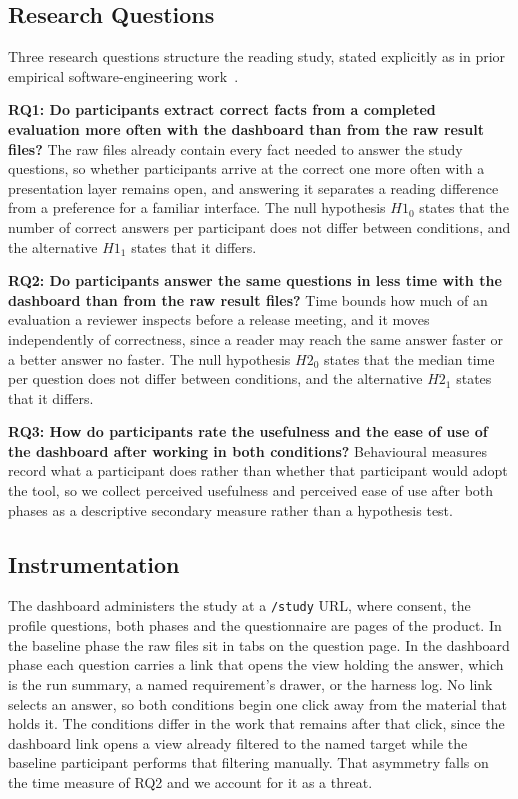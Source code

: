 \documentclass[10pt,conference]{IEEEtran}
\begin{document}
\subsection{Research Questions}
\label{sec:rqs}
Three research questions structure the reading %
study, stated explicitly as in prior empirical software-engineering work~\cite{liu2022mscpdp}.

\textbf{RQ1: Do participants extract correct facts from a completed evaluation more often with the dashboard than from the raw result files?}
The raw files already contain every fact needed to answer the study questions, so whether participants arrive at the correct one more often with a presentation layer remains open, and answering it separates a reading difference from a preference for a familiar interface.
The null hypothesis $H1_0$ states that the number of correct answers per participant does not differ between conditions, and the alternative $H1_1$ states that it differs.

\textbf{RQ2: Do participants answer the same questions in less time with the dashboard than from the raw result files?}
Time bounds how much of an evaluation a reviewer inspects before a release meeting, and it moves independently of correctness, since a reader may reach the same answer faster or a better answer no faster.
The null hypothesis $H2_0$ states that the median time per question does not differ between conditions, and the alternative $H2_1$ states that it differs.

\textbf{RQ3: How do participants rate the usefulness and the ease of use of the dashboard after working in both conditions?}
Behavioural measures record what a participant does rather than whether that participant would adopt the tool, so we collect perceived usefulness and perceived ease of use after both phases as a descriptive secondary measure rather than a hypothesis test.

\subsection{Instrumentation}
The dashboard administers the study at a \texttt{/study} URL, where consent, the profile questions, both phases and the questionnaire are pages of the product.
In the baseline phase the raw files sit in tabs on the question page.
In the dashboard phase each question carries a link that opens the view holding the answer, which is the run summary, a named requirement's drawer, or the harness log.
No link selects an answer, so both conditions begin one click away from the material that holds it.
The conditions differ in the work that remains after that click, since the dashboard link opens a view already filtered to the named target while the baseline participant performs that filtering manually.
That asymmetry falls on the time measure of RQ2 and we account for it as a threat.
\end{document}
